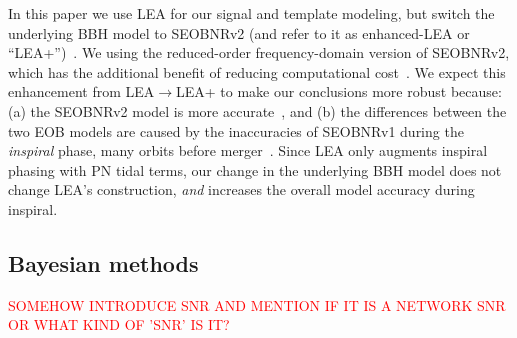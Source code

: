 \documentclass[aps,prd,amsmath,floats,floatfix, twocolumn,
superscriptaddress,nofootinbib,showpacs]{revtex4-1}
\newcommand{\red}{\textcolor{red}}
\begin{document}
In this paper we use LEA for our signal and template modeling, but switch the 
underlying BBH model to SEOBNRv2 (and refer to it as enhanced-LEA or
``LEA+'')~\cite{Taracchini:2013rva}. We using the reduced-order
frequency-domain version of SEOBNRv2, which has the additional benefit of
reducing computational cost~\cite{Purrer:2015tud}. We expect this enhancement
from LEA$\rightarrow$LEA+ to make our conclusions more robust because: (a) the 
SEOBNRv2 model is more accurate~\cite{Kumar:2015tha,Kumar:2016dhh}, and (b)
the differences between the two EOB models are caused by the
inaccuracies of SEOBNRv1 during the {\it inspiral} phase, many orbits before 
merger~\cite{Kumar:2015tha}.
Since LEA only augments inspiral phasing with PN tidal terms, our
change in the underlying BBH model does not change LEA's construction, {\it and}
increases the overall model accuracy during inspiral.


\subsection{Bayesian methods}\label{s2:bayesian}

\red{SOMEHOW INTRODUCE SNR AND MENTION IF IT IS A NETWORK SNR OR WHAT KIND OF 
'SNR' IS IT?}
\end{document}
